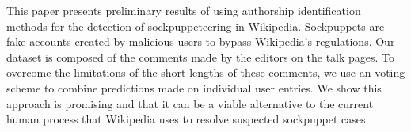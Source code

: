 This paper presents preliminary results of using authorship identification methods for the detection of sockpuppeteering in Wikipedia. Sockpuppets are
 fake accounts created by malicious users to bypass Wikipedia's regulations. Our
 dataset is composed of the comments made by the editors on the talk pages. To
 overcome the limitations of the short lengths of these comments, we use an
 voting scheme to combine predictions made on individual user entries. We show
 this approach is promising and that it can be a viable alternative to the
 current human process that Wikipedia uses to resolve suspected sockpuppet
 cases.

